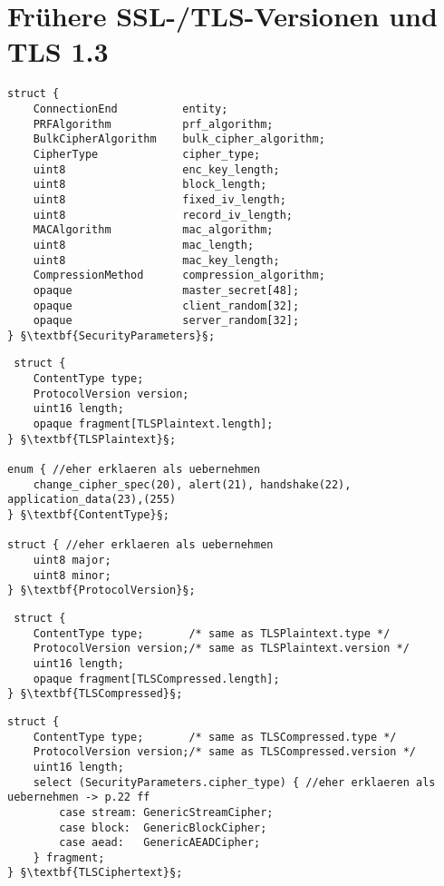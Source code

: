 \section{Frühere SSL-/TLS-Versionen und TLS 1.3}



\begin{lstlisting}
struct {
	ConnectionEnd          entity;
	PRFAlgorithm           prf_algorithm;
	BulkCipherAlgorithm    bulk_cipher_algorithm;
	CipherType             cipher_type;
	uint8                  enc_key_length;
	uint8                  block_length;
	uint8                  fixed_iv_length;
	uint8                  record_iv_length;
	MACAlgorithm           mac_algorithm;
	uint8                  mac_length;
	uint8                  mac_key_length;
	CompressionMethod      compression_algorithm;
	opaque                 master_secret[48];
	opaque                 client_random[32];
	opaque                 server_random[32];
} §\textbf{SecurityParameters}§;
\end{lstlisting}

\begin{lstlisting}
 struct {
	ContentType type;  
	ProtocolVersion version; 
	uint16 length;
	opaque fragment[TLSPlaintext.length];
} §\textbf{TLSPlaintext}§;

enum { //eher erklaeren als uebernehmen
	change_cipher_spec(20), alert(21), handshake(22), application_data(23),(255)
} §\textbf{ContentType}§;

struct { //eher erklaeren als uebernehmen
	uint8 major;
	uint8 minor;
} §\textbf{ProtocolVersion}§;
\end{lstlisting}

\begin{lstlisting}
 struct {
	ContentType type;       /* same as TLSPlaintext.type */
	ProtocolVersion version;/* same as TLSPlaintext.version */
	uint16 length;
	opaque fragment[TLSCompressed.length];
} §\textbf{TLSCompressed}§;
\end{lstlisting}

\begin{lstlisting}
struct {
	ContentType type;       /* same as TLSCompressed.type */
	ProtocolVersion version;/* same as TLSCompressed.version */
	uint16 length;
	select (SecurityParameters.cipher_type) { //eher erklaeren als uebernehmen -> p.22 ff
	    case stream: GenericStreamCipher;
	    case block:  GenericBlockCipher;
	    case aead:   GenericAEADCipher;
	} fragment;
} §\textbf{TLSCiphertext}§;
\end{lstlisting}
